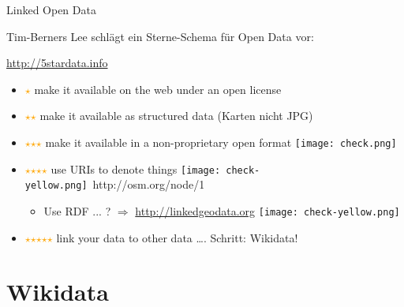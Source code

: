 \documentclass{beamer}
\newcommand{\boldm}[1] {\mathversion{bold}#1\mathversion{normal}}
\begin{document}
\begin{frame}{Linked Open Data}

  Tim-Berners Lee schlägt ein Sterne-Schema für Open Data vor:
 \vspace*{0.4cm}

  \url{http://5stardata.info}
 \vspace*{0.4cm}


  \begin{itemize}
    \item[] \textcolor{orange}{\boldm$\star$} make it available on the web under an open license \pause 
    \item[] \textcolor{orange}{\boldm$\star$$\star$} make it available as structured data (Karten nicht JPG) \pause  \pause
    \item[] \textcolor{orange}{\boldm$\star$$\star$$\star$} make it available in a non-proprietary open format \pause  \texttt{[image: check.png]} \pause
    \item[] \textcolor{orange}{\boldm$\star$$\star$$\star$$\star$} use URIs to denote things \pause  \texttt{[image: check-yellow.png]}~http://osm.org/node/1 \pause
    \begin{itemize}
      \item[] \hspace{0.5cm}Use RDF ... ? \pause $\Rightarrow$ \url{http://linkedgeodata.org} \texttt{[image: check-yellow.png]} \pause
    \end{itemize}
    \item[] \textcolor{orange}{\boldm$\star$$\star$$\star$$\star$$\star$} link your data to other data \dots {}. Schritt: Wikidata!
  \end{itemize}


\end{frame}

\section{Wikidata}
\end{document}
